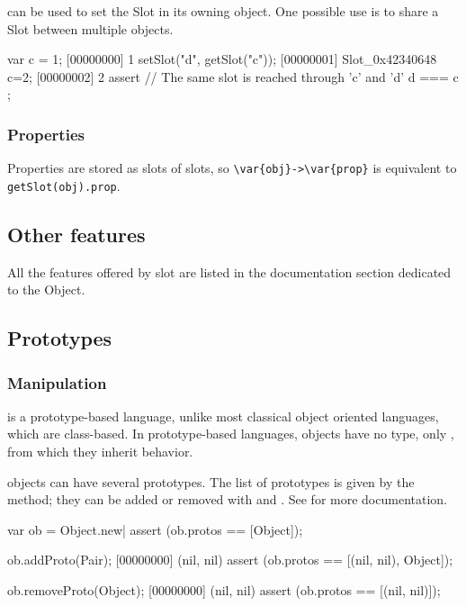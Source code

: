  can be used to set the Slot in its owning object.
One possible use is to share a Slot between multiple objects.

\begin{urbiscript}
var c = 1;
[00000000] 1
setSlot("d", getSlot("c"));
[00000001] Slot_0x42340648
c=2;
[00000002] 2
assert
{
  // The same slot is reached through 'c' and 'd'
  d === c
};

\end{urbiscript}

\subsubsection{Properties}

Properties are stored as slots of slots, so \lstinline|\var{obj}->\var{prop}|
is equivalent to \lstinline|getSlot(obj).prop|.

\subsection{Other features}

All the features offered by slot are listed in the documentation section
dedicated to the  Object.

\subsection{Prototypes}

\subsubsection{Manipulation}

\us is a prototype-based language, unlike most classical object oriented
languages, which are class-based. In prototype-based languages, objects have
no type, only , from which they inherit behavior.

\us objects can have several prototypes. The list of prototypes is given by
the  method; they can be added or removed with
 and .  See
 for more documentation.

\begin{urbiscript}
var ob = Object.new|
assert (ob.protos == [Object]);

ob.addProto(Pair);
[00000000] (nil, nil)
assert (ob.protos == [(nil, nil), Object]);

ob.removeProto(Object);
[00000000] (nil, nil)
assert (ob.protos == [(nil, nil)]);
\end{urbiscript}

